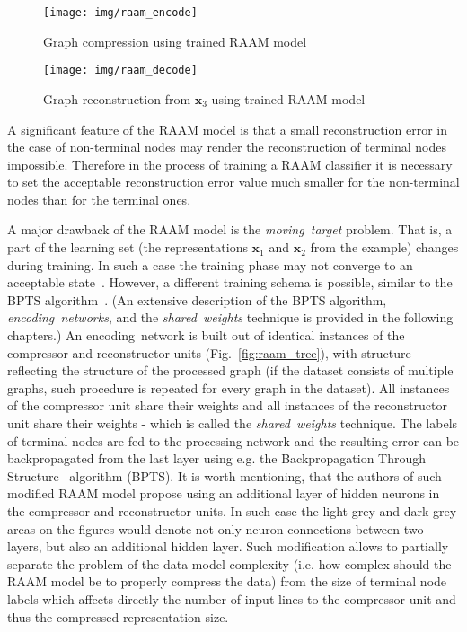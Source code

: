 \begin{figure}
\begin{center}
	\texttt{[image: img/raam\_encode]}
	\caption{Graph compression using trained RAAM model}
	\label{fig:raam_compression}
\end{center}
\end{figure}

\begin{figure}
\begin{center}
	\texttt{[image: img/raam\_decode]}
	\caption{Graph reconstruction from $\bm{x}_3$ using trained RAAM model}
	\label{fig:raam_reconstruction}
\end{center}
\end{figure}

A significant feature of the RAAM model is that a small reconstruction error in the case of non-terminal nodes may render the reconstruction of terminal nodes impossible. Therefore in the process of training a RAAM classifier it is necessary to set the acceptable reconstruction error value much smaller for the non-terminal nodes than for the terminal ones.

A major drawback of the RAAM model is the \emph{moving~target} problem. That is, a part of the learning set (the representations $\bm{x}_1$ and $\bm{x}_2$ from the example) changes during training. In such a case the training phase may not converge to an acceptable state~\cite{goulon2005hopfield}. However, a different training schema is possible, similar to the BPTS algorithm~\cite{goulon2005hopfield}. (An extensive description of the BPTS algorithm, \emph{encoding~networks}, and the \emph{shared~weights} technique is provided in the following chapters.) An encoding~network is built out of identical instances of the compressor and reconstructor units (Fig.~\ref{fig:raam_tree}), with structure reflecting the structure of the processed graph (if the dataset consists of multiple graphs, such procedure is repeated for every graph in the dataset). All instances of the compressor unit share their weights and all instances of the reconstructor unit share their weights - which is called the \emph{shared~weights} technique. The labels of terminal nodes are fed to the processing network and the resulting error can be backpropagated from the last layer using e.g. the Backpropagation Through Structure~\cite{kuchler1996inductive} algorithm (BPTS). It is worth mentioning, that the authors of such modified RAAM model propose using an additional layer of hidden neurons in the compressor and reconstructor units. In such case the light grey and dark grey areas on the figures would denote not only neuron connections between two layers, but also an additional hidden layer. Such modification allows to partially separate the problem of the data model complexity (i.e. how complex should the RAAM model be to properly compress the data) from the size of terminal node labels which affects directly the number of input lines to the compressor unit and thus the compressed representation size.

